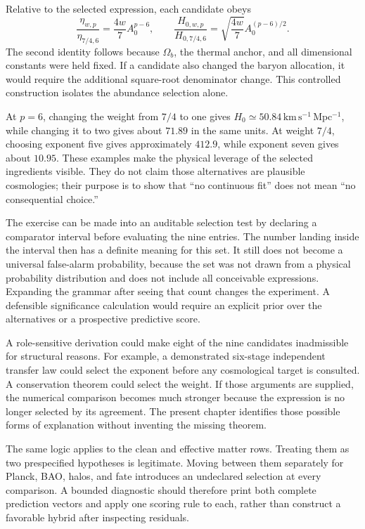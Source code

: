 Relative to the selected expression, each candidate obeys
\begin{equation}
 \frac{\eta_{w,p}}{\eta_{7/4,6}}
 =\frac{4w}{7}A_0^{p-6},\qquad
 \frac{H_{0,w,p}}{H_{0,7/4,6}}
 =\sqrt{\frac{4w}{7}}A_0^{(p-6)/2}.
 \label{c8:nineratios}
\end{equation}
The second identity follows because $\Omega_b$, the thermal anchor, and all dimensional constants were held fixed. If a candidate also changed the baryon allocation, it would require the additional square-root denominator change. This controlled construction isolates the abundance selection alone.

At $p=6$, changing the weight from $7/4$ to one gives $H_0\simeq50.84\,\mathrm{km\,s^{-1}\,Mpc^{-1}}$, while changing it to two gives about $71.89$ in the same units. At weight $7/4$, choosing exponent five gives approximately $412.9$, while exponent seven gives about $10.95$. These examples make the physical leverage of the selected ingredients visible. They do not claim those alternatives are plausible cosmologies; their purpose is to show that ``no continuous fit'' does not mean ``no consequential choice.''

The exercise can be made into an auditable selection test by declaring a comparator interval before evaluating the nine entries. The number landing inside the interval then has a definite meaning for this set. It still does not become a universal false-alarm probability, because the set was not drawn from a physical probability distribution and does not include all conceivable expressions. Expanding the grammar after seeing that count changes the experiment. A defensible significance calculation would require an explicit prior over the alternatives or a prospective predictive score.

A role-sensitive derivation could make eight of the nine candidates inadmissible for structural reasons. For example, a demonstrated six-stage independent transfer law could select the exponent before any cosmological target is consulted. A conservation theorem could select the weight. If those arguments are supplied, the numerical comparison becomes much stronger because the expression is no longer selected by its agreement. The present chapter identifies those possible forms of explanation without inventing the missing theorem.

The same logic applies to the clean and effective matter rows. Treating them as two prespecified hypotheses is legitimate. Moving between them separately for Planck, BAO, halos, and fate introduces an undeclared selection at every comparison. A bounded diagnostic should therefore print both complete prediction vectors and apply one scoring rule to each, rather than construct a favorable hybrid after inspecting residuals.

